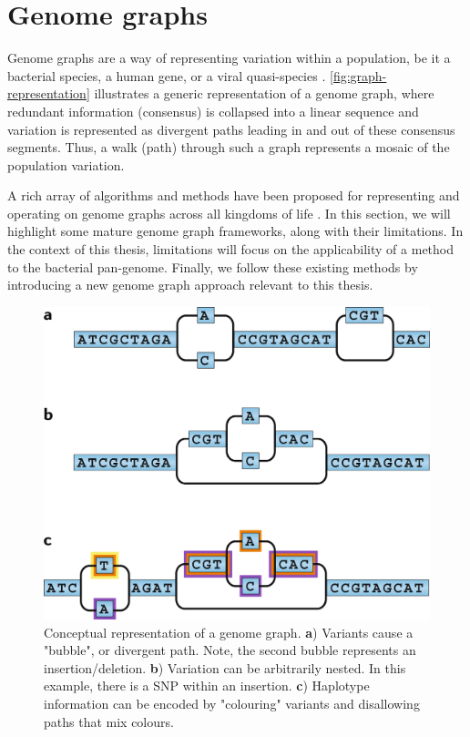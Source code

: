 \section{Genome graphs}

Genome graphs are a way of representing variation within a population, be it a bacterial species, a human gene, or a viral quasi-species \cite{comp-pan-genomics}. \autoref{fig:graph-representation} illustrates a generic representation of a genome graph, where redundant information (consensus) is collapsed into a linear sequence and variation is represented as divergent paths leading in and out of these consensus segments. Thus, a walk (path) through such a graph represents a mosaic of the population variation. 

A rich array of algorithms and methods have been proposed for representing and operating on genome graphs across all kingdoms of life \cite{Sherman2020,Eizenga2020,comp-pan-genomics}. In this section, we will highlight some mature genome graph frameworks, along with their limitations. In the context of this thesis, limitations will focus on the applicability of a method to the bacterial pan-genome. Finally, we follow these existing methods by introducing a new genome graph approach relevant to this thesis.

\begin{figure}
\centering
\includegraphics[width=0.6\columnwidth]{Chapter0/Figs/graph-representation.png}
\caption{Conceptual representation of a genome graph. \textbf{a}) Variants cause a "bubble", or divergent path. Note, the second bubble represents an insertion/deletion. \textbf{b}) Variation can be arbitrarily nested. In this example, there is a SNP within an insertion. \textbf{c}) Haplotype information can be encoded by "colouring" variants and disallowing paths that mix colours.}
\label{fig:graph-representation}
\end{figure}

